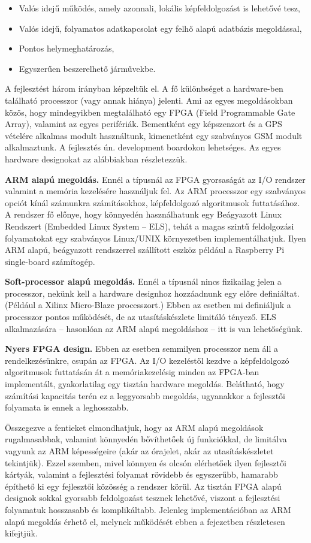 \documentclass[a4paper,12pt]{report}
\begin{document}
\begin{itemize}
\item Valós idejű működés, amely azonnali, lokális képfeldolgozást is lehetővé tesz,
\item Valós idejű, folyamatos adatkapcsolat egy felhő alapú adatbázis megoldással,
\item Pontos helymeghatározás,
\item Egyszerűen beszerelhető járművekbe.
\end{itemize}

A fejlesztést három irányban képzeltük el. A fő különbséget a hardware-ben található processzor (vagy annak hiánya) jelenti. Ami az egyes megoldásokban közös, hogy mindegyikben megtalálható egy FPGA (Field Programmable Gate Array), valamint az egyes perifériák. Bementként egy képszenzort és a GPS vételére alkalmas modult használtunk, kimenetként egy szabványos GSM modult alkalmaztunk. A fejlesztés ún. development boardokon lehetséges. Az egyes hardware designokat az alábbiakban részletezzük.

{\bf{ARM alapú megoldás.}} Ennél a típusnál az FPGA gyorsaságát az I/O rendszer valamint a memória kezelésére használjuk fel. Az ARM processzor egy szabványos opciót kínál számunkra számításokhoz, képfeldolgozó algoritmusok futtatásához. A rendszer fő előnye, hogy könnyedén használhatunk egy Beágyazott Linux Rendszert (Embedded Linux System -- ELS), tehát a magas szintű feldolgozási folyamatokat egy szabványos Linux/UNIX környezetben implementálhatjuk. Ilyen ARM alapú, beágyazott rendszerrel szállított eszköz például a Raspberry Pi single-board számítogép.

{\bf{Soft-processor alapú megoldás.}} Ennél a típusnál nincs fizikailag jelen a processzor, nekünk kell a hardware designhoz hozzáadnunk egy előre definiáltat. (Például a Xilinx Micro-Blaze processzort.) Ebben az esetben mi definiáljuk a processzor pontos működését, de az utasításkészlete limitáló tényező. ELS alkalmazására -- hasonlóan az ARM alapú megoldáshoz -- itt is van lehetőségünk.

{\bf{Nyers FPGA design.}} Ebben az esetben semmilyen processzor nem áll a rendelkezésünkre, csupán az FPGA. Az I/O kezeléstől kezdve a képfeldolgozó algoritmusok futtatásán át a memóriakezelésig minden az FPGA-ban implementált, gyakorlatilag egy tisztán hardware megoldás. Belátható, hogy számítási kapacitás terén ez a leggyorsabb megoldás, ugyanakkor a fejlesztői folyamata is ennek a leghosszabb.

Összegezve a fentieket elmondhatjuk, hogy az ARM alapú megoldások rugalmasabbak, valamint könnyedén bővíthetőek új funkciókkal, de limitálva vagyunk az ARM képességeire (akár az órajelet, akár az utasításkészletet tekintjük).  Ezzel szemben, mivel könnyen és olcsón elérhetőek ilyen fejlesztői kártyák, valamint a fejlesztési folyamat rövidebb és egyszerűbb, hamarabb építhető ki egy fejlesztői közösség a rendszer körül. Az tisztán FPGA alapú designok sokkal gyorsabb feldolgozást tesznek lehetővé, viszont a fejlesztési folyamatuk hosszasabb és komplikáltabb. Jelenleg implementációban az ARM alapú megoldás érhető el, melynek működését ebben a fejezetben részletesen kifejtjük.
\end{document}
